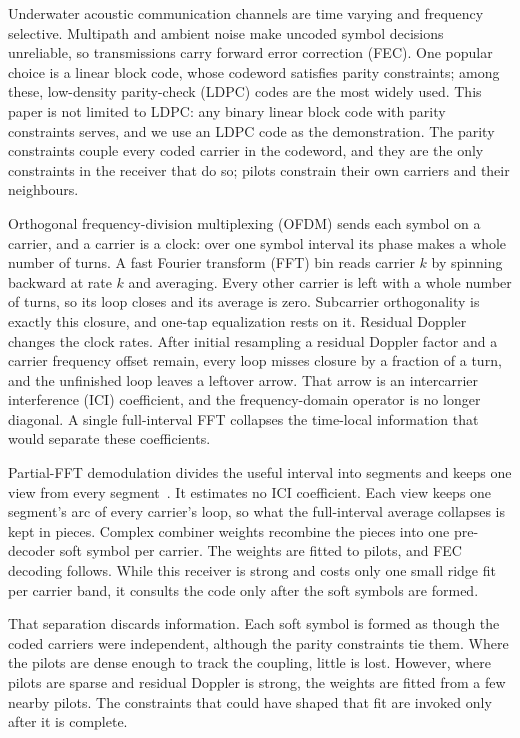 \documentclass[conference]{IEEEtran}
\begin{document}
Underwater acoustic communication channels are time varying and frequency
selective.  Multipath and ambient noise make uncoded symbol decisions
unreliable, so transmissions carry forward error correction (FEC).  One
popular choice is a linear block code, whose codeword satisfies parity
constraints; among these, low-density parity-check (LDPC) codes are the most
widely used.  This paper is not limited to LDPC: any binary linear block code with
parity constraints serves, and we use an LDPC code as the demonstration.
The parity constraints couple every coded carrier in the codeword, and they
are the only constraints in the receiver that do so; pilots constrain their
own carriers and their neighbours.

Orthogonal frequency-division multiplexing (OFDM) sends each symbol on a
carrier, and a carrier is a clock: over one symbol interval its phase makes
a whole number of turns.  A fast Fourier transform (FFT) bin reads carrier
\(k\) by spinning backward at rate \(k\) and averaging.  Every other
carrier is left with a whole number of turns, so its loop closes and its
average is zero.  Subcarrier orthogonality is exactly this closure, and
one-tap equalization rests on it.  Residual Doppler changes the clock
rates.  After initial resampling a residual Doppler factor and a carrier
frequency offset remain, every loop misses closure by a fraction of a turn,
and the unfinished loop leaves a leftover arrow.  That arrow is an
intercarrier interference (ICI) coefficient, and the frequency-domain
operator is no longer diagonal.  A single full-interval FFT collapses the
time-local information that would separate these coefficients.

Partial-FFT demodulation divides the useful interval into segments and keeps
one view from every segment~\cite{yerramalli}.  It estimates no ICI
coefficient.  Each view keeps one segment's arc of every carrier's loop, so
what the full-interval average collapses is kept in pieces.  Complex
combiner weights recombine the pieces into one pre-decoder soft symbol per
carrier.  The weights are fitted to pilots, and FEC decoding
follows.  While this receiver is strong and
costs only one small ridge fit per carrier band, it consults the code only
after the soft symbols are formed.

That separation discards information.  Each soft symbol is formed as though
the coded carriers were independent, although the parity constraints tie
them.  Where the pilots are dense enough to track the coupling, little is
lost.  However, where pilots are sparse and residual Doppler is strong, the
weights are fitted from a few nearby pilots.  The constraints that could have
shaped that fit are invoked only after it is complete.
\end{document}
